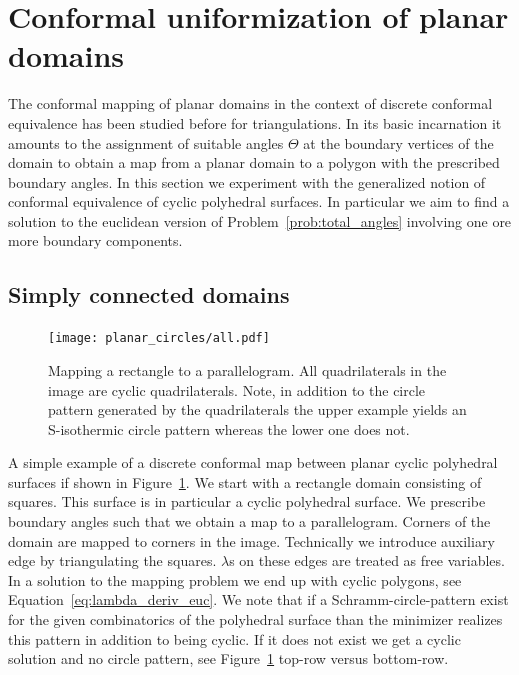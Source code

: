 \documentclass[Thesis]{subfiles}
\begin{document}
\section{Conformal uniformization of planar domains}
\label{sec:planar_domains}

The conformal mapping of planar domains in the context of discrete conformal equivalence has been studied before for triangulations. 
In its basic incarnation it amounts to the assignment of suitable angles $\Theta$ at the boundary vertices of the domain to obtain a map from a planar domain to a polygon with the prescribed boundary angles. 
In this section we experiment with the generalized notion of conformal equivalence of cyclic polyhedral surfaces.
In particular we aim to find a solution to the euclidean version of Problem~\ref{prob:total_angles} involving one ore more boundary components.

\subsection{Simply connected domains}

\begin{figure}
\centering
\texttt{[image: planar\_circles/all.pdf]}
\\
\caption{
Mapping a rectangle to a parallelogram.
All quadrilaterals in the image are cyclic quadrilaterals.
Note, in addition to the circle pattern generated by the quadrilaterals the upper example yields an S-isothermic circle pattern whereas the lower one does not.
}
\label{fig:cyclic_parallelogram}
\end{figure}

A simple example of a discrete conformal map between planar cyclic polyhedral surfaces if shown in Figure~\ref{fig:cyclic_parallelogram}. 
We start with a rectangle domain consisting of squares. 
This surface is in particular a cyclic polyhedral surface. 
We prescribe boundary angles such that we obtain a map to a parallelogram.
Corners of the domain are mapped to corners in the image. 
Technically we introduce auxiliary edge by triangulating the squares. $\lambda$s on these edges are treated as free variables. 
In a solution to the mapping problem we end up with cyclic polygons, see Equation~\ref{eq:lambda_deriv_euc}.
We note that if a Schramm-circle-pattern \cite{S97} exist for the given combinatorics of the polyhedral surface than the minimizer realizes this pattern in addition to being cyclic. 
If it does not exist we get a cyclic solution and no circle pattern, see Figure~\ref{fig:cyclic_parallelogram} top-row versus bottom-row.
\end{document}
